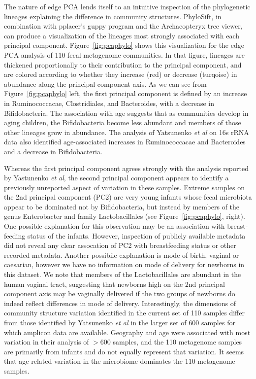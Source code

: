 \documentclass[10pt]{article}
\begin{document}
The nature of edge PCA lends itself to an intuitive inspection of the phylogenetic lineages explaining the difference in community structures.
PhyloSift, in combination with pplacer's guppy program and the Archaeopteryx tree viewer, can produce a visualization of the lineages most strongly associated with each principal component.
Figure~\ref{fig:pcaphylo} shows this visualization for the edge PCA analysis of 110 fecal metagenome communities.
In that figure, lineages are thickened proportionally to their contribution to the principal component, and are colored according to whether they increase (red) or decrease (turqoise) in abundance along the principal component axis.
As we can see from Figure~\ref{fig:pcaphylo} left, the first principal component is defined by an increase in Ruminococcacae, Clostridiales, and Bacteroides, with a decrease in Bifidobacteria. 
The association with age suggests that as communities develop in aging children, the Bifidobacteria become less abundant and members of those other lineages grow in abundance.
The analysis of Yatsunenko \textit{et al} on 16s rRNA data also identified age-associated increases in Ruminococcacae and Bacteroides and a decrease in Bifidobacteria.

Whereas the first principal component agrees strongly with the analysis reported by Yastunenko \textit{et al}, the second principal component appears to identify a previously unreported aspect of variation in these samples.
Extreme samples on the 2nd principal component (PC2) are very young infants whose fecal microbiota appear to be dominated not by Bifidobacteria, but instead by members of the genus Enterobacter and family Lactobacillales (see Figure~\ref{fig:pcaphylo}, right).
One possible explanation for this observation may be an association with breast-feeding status of the infants.
However, inspection of publicly available metadata did not reveal any clear assocation of PC2 with breastfeeding status or other recorded metadata.
Another possibile explanation is mode of birth, vaginal or caesarian, however we have no information on mode of delivery for newborns in this dataset.
We note that members of the Lactobacillales are abundant in the human vaginal tract, suggesting that newborns high on the 2nd principal component axis may be vaginally delivered if the two groups of newborns do indeed reflect differences in mode of delivery.
Interestingly, the dimensions of community structure variation identified in the current set of 110 samples differ from those identified by Yatsunenko \textit{et al} in the larger set of 600 samples for which amplicon data are available.
Geography and age were associated with most variation in their analysis of $>$600 samples, and the 110 metagenome samples are primarily from infants and do not equally represent that variation.
It seems that age-related variation in the microbiome dominates the 110 metagenome samples.
\end{document}
